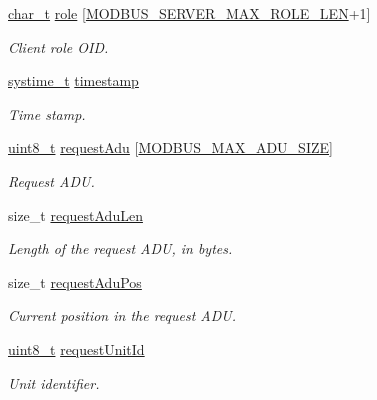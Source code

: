 \begin{DoxyCompactItemize}
\hyperlink{compiler__port_8h_a40bb5262bf908c328fbcfbe5d29d0201}{char\+\_\+t} \hyperlink{struct__ModbusClientConnection_a189891d3c89122bf7d00d652ab21feef}{role} \mbox{[}\hyperlink{modbus__server_8h_a947b1c390d76861c92c77fe57d9d1a37}{M\+O\+D\+B\+U\+S\+\_\+\+S\+E\+R\+V\+E\+R\+\_\+\+M\+A\+X\+\_\+\+R\+O\+L\+E\+\_\+\+L\+EN}+1\mbox{]}
\begin{DoxyCompactList}\small\item\em Client role O\+ID. \end{DoxyCompactList}\item 
\hyperlink{compiler__port_8h_ae3e32a98d431a02106616da3071832dd}{systime\+\_\+t} \hyperlink{struct__ModbusClientConnection_a4a7311c0a99826096d7c8348b4193f98}{timestamp}
\begin{DoxyCompactList}\small\item\em Time stamp. \end{DoxyCompactList}\item 
\hyperlink{stdint_8h_aba7bc1797add20fe3efdf37ced1182c5}{uint8\+\_\+t} \hyperlink{struct__ModbusClientConnection_a7304351936a24772abfa701fe07194b4}{request\+Adu} \mbox{[}\hyperlink{modbus__common_8h_a2c01d2b429ca01511f3f6b8c63edfda8}{M\+O\+D\+B\+U\+S\+\_\+\+M\+A\+X\+\_\+\+A\+D\+U\+\_\+\+S\+I\+ZE}\mbox{]}
\begin{DoxyCompactList}\small\item\em Request A\+DU. \end{DoxyCompactList}\item 
size\+\_\+t \hyperlink{struct__ModbusClientConnection_ab587e0a7d03258fd866267dcfc11a447}{request\+Adu\+Len}
\begin{DoxyCompactList}\small\item\em Length of the request A\+DU, in bytes. \end{DoxyCompactList}\item 
size\+\_\+t \hyperlink{struct__ModbusClientConnection_ace8e62ed6b108e3ac37140d3f2d10710}{request\+Adu\+Pos}
\begin{DoxyCompactList}\small\item\em Current position in the request A\+DU. \end{DoxyCompactList}\item 
\hyperlink{stdint_8h_aba7bc1797add20fe3efdf37ced1182c5}{uint8\+\_\+t} \hyperlink{struct__ModbusClientConnection_a118d3697095f84f1628d6335959ddcfd}{request\+Unit\+Id}
\begin{DoxyCompactList}\small\item\em Unit identifier. \end{DoxyCompactList}\item 

\end{DoxyCompactItemize}
